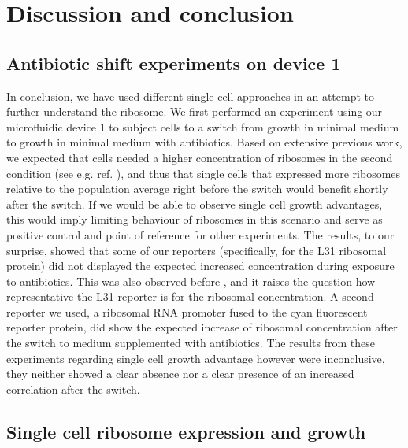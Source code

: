\section{Discussion and conclusion}


\subsection{Antibiotic shift experiments on device 1}

In conclusion, we have used different single cell approaches in an attempt to further understand the ribosome.
%
We first performed an experiment using our microfluidic device 1 to subject cells to a switch from growth in minimal medium to growth in minimal medium with antibiotics.
Based on extensive previous work, we expected that cells needed a higher concentration of ribosomes in the second condition (see e.g. ref. \cite{You2013}), and thus that single cells that expressed more ribosomes relative to the population average right before the switch would benefit shortly after the switch.
%
If we would be able to observe single cell growth advantages, this would imply limiting behaviour of ribosomes in this scenario and serve as positive control and point of reference for other experiments. 
%
The results, to our surprise, showed that some of our reporters (specifically, for the L31 ribosomal protein) did not displayed the expected increased concentration during exposure to antibiotics.
%
This was also observed before \cite{Walker2016t}, and it
raises the question how representative the L31 reporter is for the ribosomal concentration.
%
A second reporter we used, a ribosomal RNA promoter fused to the cyan fluorescent reporter protein, did show the expected increase of ribosomal concentration after the switch to medium supplemented with antibiotics.
%
The results from these experiments regarding single cell growth advantage however were inconclusive, they neither showed a clear absence nor a clear presence of an increased correlation after the switch.

\subsection{Single cell ribosome expression and growth}

